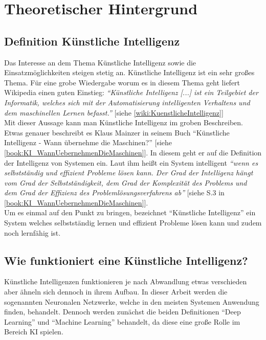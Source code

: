 \section{Theoretischer Hintergrund}
\label{sec:theorie}
    \subsection{Definition Künstliche Intelligenz}
    \label{subsec:definiton_kuenstliche_intelligenz}
    Das Interesse an dem Thema Künstliche Intelligenz sowie die Einsatzmöglichkeiten steigen stetig an. Künstliche Intelligenz ist ein sehr großes Thema. Für eine grobe Wiedergabe worum es in diesem Thema geht liefert Wikipedia einen guten Einstieg: 
    \textit{\enquote{Künstliche Intelligenz [...] ist ein Teilgebiet der Informatik, welches sich mit der Automatisierung intelligenten Verhaltens und dem maschinellen Lernen befasst.}} [siehe \ref{wiki:KuenstlicheIntelligenz}]\\

    Mit dieser Aussage kann man Künstliche Intelligenz im groben Beschreiben. Etwas genauer beschreibt es Klaus Mainzer in seinem Buch \enquote{Künstliche Intelligenz - Wann übernehme die Maschinen?} [siehe \ref{book:KI_WannUebernehmenDieMaschinen}]. In diesem geht er auf die Definition der Intelligenz von Systemen ein. Laut ihm heißt ein System intelligent \textit{\enquote{wenn es selbstständig und effizient Probleme lösen kann. Der Grad der Intelligenz hängt vom Grad der Selbstständigkeit, dem Grad der Komplexität des Problems und dem Grad der Effizienz des Problemlösungsverfahrens ab}} [siehe S.3 in \ref{book:KI_WannUebernehmenDieMaschinen}].\\
    
    Um es einmal auf den Punkt zu bringen, bezeichnet \enquote{Künstliche Intelligenz} ein System welches selbstständig lernen und effizient Probleme lösen kann und zudem noch lernfähig ist.

    \subsection{Wie funktioniert eine Künstliche Intelligenz?}
    \label{subsec:wie_funktioniert_eine_kuenstliche_intelligenz}
    Künstliche Intelligenzen funktionieren je nach Abwandlung etwas verschieden aber ähneln sich dennoch in ihrem Aufbau. In dieser Arbeit werden die sogenannten Neuronalen Netzwerke, welche in den meisten Systemen Anwendung finden, behandelt. Dennoch werden zunächst die beiden Definitionen \enquote{Deep Learning} und \enquote{Machine Learning} behandelt, da diese eine große Rolle im Bereich KI spielen.


